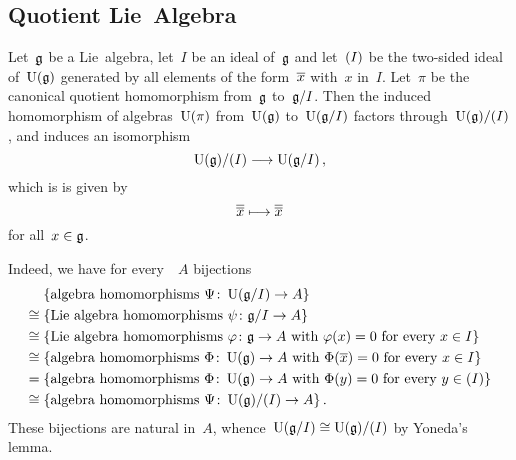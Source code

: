 



\subsection{Quotient Lie~Algebra}


\begin{example}
	\label{universal enveloping algebra of quotient}
	Let~$\mathfrak{g}$ be a Lie~algebra, let~$I$ be an ideal of~$\mathfrak{g}$ and let~$\lparen I\rparen$ be the two-sided ideal of~$\operatorname{U}(\mathfrak{g})$ generated by all elements of the form~$\overline{x}$ with~$x$ in~$I$.
	Let~$\pi$ be the canonical quotient homomorphism from~$\mathfrak{g}$ to~$\mathfrak{g}/I$.
	Then the induced homomorphism of algebras~$\operatorname{U}(\pi)$ from~$\operatorname{U}(\mathfrak{g})$ to~$\operatorname{U}(\mathfrak{g}/I)$ factors through~$\operatorname{U}(\mathfrak{g}) / \lparen I\rparen$, and induces an isomorphism
	\[
		\Univ(\glie) / \ideal{I}
		\to
		\Univ(\glie/I) \,,
		\index{universal enveloping algebra!of a quotient Lie algebra}
	\]
	which is is given by
	\[
		\class{ \class{x} }
		\mapsto
		\class{ \class{x} }
	\]
	for all~$x \in \mathfrak{g}$.

	Indeed, we have for every~{\algebra{$\kf$}}~$A$ bijections
	\begin{align*}
		{}&
		\{ \textstyle\text{algebra homomorphisms~$\Psi \colon \Univ(\glie/I) \to A$} \}
		\\
		\cong{}&
		\{ \textstyle\text{Lie~algebra homomorphisms~$\psi \colon \glie/I \to A$} \}
		\\
		\cong{}&
		\{ \textstyle\text{Lie~algebra homomorphisms~$\varphi \colon \glie \to A$ with~$\varphi(x) = 0$ for every~$x \in I$} \}
		\\
		\cong{}&
		\{ \textstyle\text{algebra homomorphisms~$\Phi \colon \Univ(\glie) \to A$ with~$\Phi(\class{x}) = 0$ for every~$x \in I$} \}
		\\
		={}&
		\{ \textstyle\text{algebra homomorphisms~$\Phi \colon \Univ(\glie) \to A$ with~$\Phi(y) = 0$ for every~$y \in \ideal{I}$} \}
		\\
		\cong{}&
		\{ \textstyle\text{algebra homomorphisms~$\Psi \colon \Univ(\glie) / \ideal{I} \to A$} \} \,.
	\end{align*}
	These bijections are natural in~$A$, whence~$\operatorname{U}(\mathfrak{g}/I) \cong \operatorname{U}(\mathfrak{g}) / \lparen I\rparen$ by Yoneda’s lemma.
	

\end{example}
